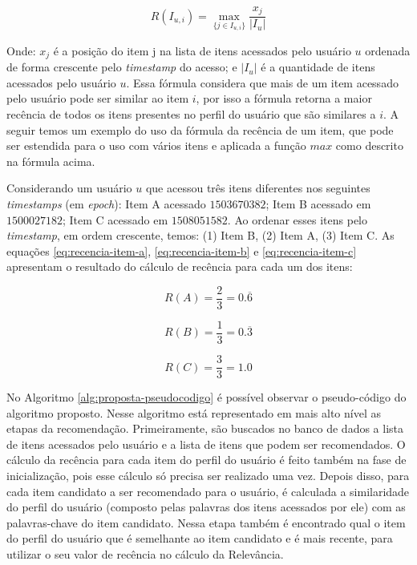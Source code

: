 \begin{equation}
  R(I_{u,i}) = \max_{\{j \in I_{u,i}\}}{\frac{x_j}{\left| I_u \right|}}
  \label{eq:recencia-proposta}
\end{equation}

Onde: $x_j$ é a posição do item j na lista de itens acessados pelo usuário $u$ ordenada de forma crescente pelo
\textit{timestamp} do acesso; e $\left| I_u \right|$ é a quantidade de itens acessados pelo usuário $u$. Essa fórmula considera
que mais de um item acessado pelo usuário pode ser similar ao item $i$, por isso a fórmula retorna a maior recência de
todos os itens presentes no perfil do usuário que são similares a $i$. A seguir temos um exemplo do uso da fórmula da
recência de um item, que pode ser estendida para o uso com vários itens e aplicada a função $max$ como descrito na
fórmula acima.

Considerando um usuário $u$ que acessou três itens diferentes nos seguintes \textit{timestamps} (em \textit{epoch}):
Item A acessado $1503670382$; Item B acessado em $1500027182$; Item C acessado em $1508051582$. Ao ordenar esses itens
pelo \textit{timestamp}, em ordem crescente, temos: (1) Item B, (2) Item A, (3) Item C. As equações \ref{eq:recencia-item-a},
\ref{eq:recencia-item-b} e \ref{eq:recencia-item-c} apresentam o resultado do cálculo de recência para cada um dos itens:

\begin{equation}
  R(A) = \frac{2}{3} = 0.\overline{6}
  \label{eq:recencia-item-a}
\end{equation}

\begin{equation}
  R(B) = \frac{1}{3} = 0.\overline{3}
  \label{eq:recencia-item-b}
\end{equation}

\begin{equation}
  R(C) = \frac{3}{3} = 1.0
  \label{eq:recencia-item-c}
\end{equation}

No Algoritmo \ref{alg:proposta-pseudocodigo} é possível observar o pseudo-código do algoritmo proposto. Nesse algoritmo
está representado em mais alto nível as etapas da recomendação. Primeiramente, são buscados no banco de dados a lista de itens
acessados pelo usuário e a lista de itens que podem ser recomendados. O cálculo da recência para cada item do perfil do usuário
é feito também na fase de inicialização, pois esse cálculo só precisa ser realizado uma vez. Depois disso, para cada item
candidato a ser recomendado para o usuário, é calculada a similaridade do perfil do usuário (composto pelas palavras dos itens acessados
por ele) com as palavras-chave do item candidato. Nessa etapa também é encontrado qual o item do perfil do usuário que é semelhante
ao item candidato e é mais recente, para utilizar o seu valor de recência no cálculo da Relevância.

